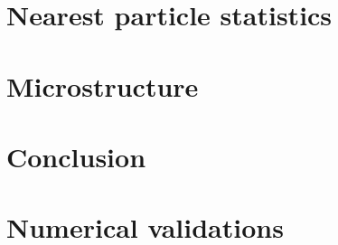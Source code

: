 \documentclass[11pt]{My_preprint}
\begin{document}
\section{Nearest particle statistics}
\label{sec:nearest}


\section{Microstructure}
\label{sec:microstructure}



\section{Conclusion}
\label{sec:conclusion}


\appendix



\section{Numerical validations}
\label{ap:validation}




\end{document}
